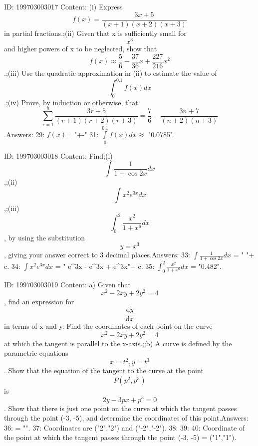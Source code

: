 \documentclass{article}
\begin{document}
ID: 199703003017
Content:
(i) Express \[f(x) = \frac {3x + 5}{(x + 1)(x + 2)(x + 3)}\] in partial fractions.;(ii) Given that x is sufficiently small for \[x^{3}\] and higher powers of x to be neglected, show that \[f(x) \approx \frac {5}{6} - \frac {37}{36}x + \frac {227}{216}x^{2}\].;(iii) Use the quadratic approximation in (ii) to estimate the value of \[\int_{0}^{0.1} f(x)dx\].;(iv) Prove, by induction or otherwise, that \[\sum_{r=1}^{n} \frac {3r + 5}{(r+1)(r+2)(r+3)} = \frac {7}{6} - \frac {3n + 7}{(n+2)(n+3)}\].Answers:
29: $f(x)$= "+-"
31: $\int \limits_{0}^{0.1}{f\left( x \right) dx} \approx$ "0.0785".

ID: 199703003018
Content:
Find;(i) \[\int \frac {1}{1 + \cos 2x} dx\],;(ii) \[\int x^{2} e^{3x} dx\],;(iii)\[\int_{0}^{2} \frac {x^{2}}{1 + x^{6}} dx\], by using the substitution \[y = x^{3}\], giving your answer correct to 3 decimal places.Answers:
33: $\int \frac{1}{1+\cos 2x} dx$ = " "+ c.
34: $\int x^2 e^{3x} dx$ = " e^{3x} -  e^{3x} +  e^{3x}"+ c.
35: $\int_0^2 \frac{x^2}{1+x^6} dx$ = "0.482".

ID: 199703003019
Content:
a) Given that \[x^{2} - 2xy + 2y^{2} = 4\], find an expression for \[\frac{\mathrm{d} y}{\mathrm{d} x}\] in terms of x and y. Find the coordinates of each point on the curve \[x^{2} - 2xy + 2y^{2} = 4\] at which the tangent is parallel to the x-axis.;;b) A curve is defined by the parametric equations \[x = t^{2}, y = t^{3}\]. Show that the equation of the tangent to the curve at the point \[P(p^{2}, p^{3})\] is \[2y - 3px + p^{3} = 0\]. Show that there is just one point on the curve at which the tangent passes through the point (-3, -5), and determine the coordinates of this point.Answers:
36:  = "".
37: Coordinates are ("2","2") and ("-2","-2").
38: 
39: 
40: Coordinate of the point at which the tangent passes through the point (-3, -5) = ("1","1").
\end{document}
